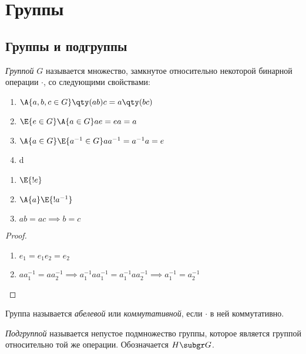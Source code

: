 \section{Группы}
\subsection{Группы и подгруппы}

\begin{definition}
  \emph{Группой} $G$ называется множество, замкнутое относительно некоторой бинарной операции $\cdotp$, со следующими свойствами:
  \begin{enumerate}
    \item $\A{a,b,c \in G}\qty(ab)c=a\qty(bc)$
    \item $\E{e\in G}\A{a \in G} ae=ea=a$
    \item $\A{a\in G}\E{a^{-1}\in G} aa^{-1}=a^{-1} a=e$
    \item d
  \end{enumerate}
\end{definition}

\begin{theorem}
  \theoremlistshack
  \begin{enumerate}
    \item $\E{!e}$
    \item $\A{a}\E{!a^{-1}}$
    \item $ab=ac \implies b=c$
  \end{enumerate}
\end{theorem}
\begin{proof}
  \theoremlistshack
  \begin{enumerate}
    \item $e_1=e_1e_2=e_2$
    \item $aa^{-1}_1=aa^{-1}_2 \implies a^{-1}_1aa^{-1}_1=a^{-1}_1aa^{-1}_2\implies a^{-1}_1=a^{-1}_2$
  \end{enumerate}
\end{proof}

\begin{definition}
  Группа называется \emph{абелевой} или \emph{коммутативной}, если $\cdotp$ в ней коммутативно.
\end{definition}

\begin{definition}
  \emph{Подгруппой} называется непустое подмножество группы, которое является группой относительно той же операции. Обозначается $H \subgr G$.
\end{definition}

